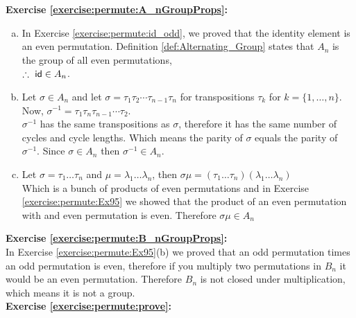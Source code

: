 \noindent\textbf{Exercise  \ref{exercise:permute:A_nGroupProps}:} %
\begin{enumerate}[(a)]
\item
In Exercise \ref{exercise:permute:id_odd}, we proved that the identity element is an even permutation. Definition \ref{def:Alternating_Group} states that $A_{n}$ is the group of all even permutations,\\
$\therefore\ {\sf{i}d}\in A_{n}$.

\item
Let $\sigma\in A_{n}$ and let $\sigma=\tau_{1}\tau_{2}\cdots\tau_{n-1}\tau_{n}$ for transpositions $\tau_{k}$ for $k=\{1,\dots,n\}$. Now, $\sigma^{-1}=\tau_{1}\tau_{n}\tau_{n-1}\cdots\tau_{2}$.\\
        
$\sigma^{-1}$ has the same transpositions as $\sigma$, therefore it has the same number of cycles and cycle lengths. Which means the parity of $\sigma$ equals the parity of $\sigma^{-1}$. Since $\sigma\in A_{n}$ then $\sigma^{-1}\in A_{n}$.
        
\item
Let $\sigma=\tau_{1}\dots\tau_{n}$ and $\mu=\lambda_{1}\dots\lambda_{n}$, then $\sigma\mu=(\tau_{1}\dots\tau_{n})(\lambda_{1}\dots\lambda_{n})$\\

Which is a bunch of products of even permutations and in Exercise \ref{exercise:permute:Ex95} we showed that the product of an even permutation with and even permutation is even. Therefore $\sigma\mu\in A_{n}$
\end{enumerate}

\noindent\textbf{Exercise  \ref{exercise:permute:B_nGroupProps}:}\\ %
In Exercise  \ref{exercise:permute:Ex95}(b) we proved that an odd permutation times an odd permutation is even, therefore if you multiply two permutations in $B_{n}$ it would be an even permutation. Therefore $B_{n}$ is not closed under multiplication, which means it is not a group.\\

\noindent\textbf{Exercise  \ref{exercise:permute:prove}:}\\

